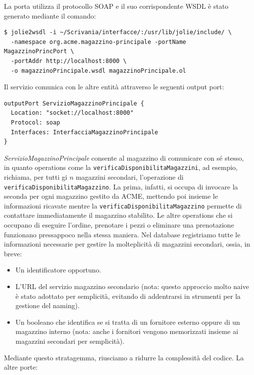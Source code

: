 \documentclass[twoside]{article}
\begin{document}
La porta utilizza il protocollo SOAP e il suo corrispondente WSDL è stato generato mediante il comando:

\begin{lstlisting}
$ jolie2wsdl -i ~/Scrivania/interfacce/:/usr/lib/jolie/include/ \
  -namespace org.acme.magazzino-principale -portName MagazzinoPrincPort \
  -portAddr http://localhost:8000 \
  -o magazzinoPrincipale.wsdl magazzinoPrincipale.ol
\end{lstlisting}

Il servizio comunica con le altre entità attraverso le seguenti output port:

\begin{lstlisting}
outputPort ServizioMagazzinoPrincipale {
  Location: "socket://localhost:8000"
  Protocol: soap 
  Interfaces: InterfacciaMagazzinoPrincipale
}
\end{lstlisting}

\textit{ServizioMagazzinoPrincipale} consente al magazzino di comunicare con sé stesso, in
quanto operations come la \texttt{verificaDisponibilitaMagazzini}, ad esempio,
richiama, per tutti gi $n$ magazzini secondari, l'operazione di \newline
\texttt{verificaDisponibilitaMagazzino}. La prima, infatti, si occupa di invocare la seconda
per ogni magazzino gestito da ACME, mettendo poi insieme le informazioni ricavate mentre la 
\texttt{verificaDisponibilitaMagazzino} permette di contattare immediatamente il magazzino stabilito.
Le altre operations che si occupano di eseguire l'ordine, prenotare i pezzi o eliminare una
prenotazione funzionano pressappoco nella stessa maniera.
Nel database registriamo tutte le informazioni necessarie per gestire la molteplicità di magazzini
secondari, ossia, in breve:
\begin{itemize}
	\item Un identificatore opportuno.
	\item L'URL del servizio magazzino secondario (nota: questo approccio molto naive è stato
		  adottato per semplicità, evitando di addentrarsi in strumenti per la gestione del
		  naming).
	\item Un booleano che identifica se si tratta di un fornitore esterno oppure di un
		  magazzino interno (nota: anche i fornitori vengono memorizzati insieme ai
		  magazzini secondari per semplicità).
\end{itemize}

Mediante questo stratagemma, riusciamo a ridurre la complessità del codice.
La altre porte:
\end{document}
